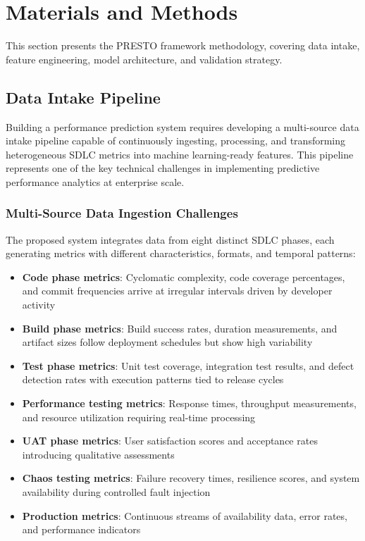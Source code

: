 \documentclass[technologies,article,submit,pdftex,moreauthors]{Definitions/mdpi}
\begin{document}
\section{Materials and Methods}\label{sec:methodology}

This section presents the PRESTO framework methodology, covering data
intake, feature engineering, model architecture, and validation
strategy.

\subsection{Data Intake Pipeline}\label{sec:data_intake}

Building a performance prediction system requires developing a
multi-source data intake pipeline capable of continuously ingesting,
processing, and transforming heterogeneous SDLC metrics into machine
learning-ready features. This pipeline represents one of the key
technical challenges in implementing predictive performance analytics at
enterprise scale.

\subsubsection{Multi-Source Data Ingestion
Challenges}\label{sec:ingestion_challenges}

The proposed system integrates data from eight distinct SDLC phases,
each generating metrics with different characteristics, formats, and
temporal patterns:

\begin{itemize}
\item
  \textbf{Code phase metrics}: Cyclomatic complexity, code coverage
  percentages, and commit frequencies arrive at irregular intervals
  driven by developer activity
\item
  \textbf{Build phase metrics}: Build success rates, duration
  measurements, and artifact sizes follow deployment schedules but show
  high variability
\item
  \textbf{Test phase metrics}: Unit test coverage, integration test
  results, and defect detection rates with execution patterns tied to
  release cycles
\item
  \textbf{Performance testing metrics}: Response times, throughput
  measurements, and resource utilization requiring real-time processing
\item
  \textbf{UAT phase metrics}: User satisfaction scores and acceptance
  rates introducing qualitative assessments
\item
  \textbf{Chaos testing metrics}: Failure recovery times, resilience
  scores, and system availability during controlled fault
  injection~\cite{basiri2016, rosenthal2020}
\item
  \textbf{Production metrics}: Continuous streams of availability data,
  error rates, and performance indicators
\end{itemize}
\end{document}
